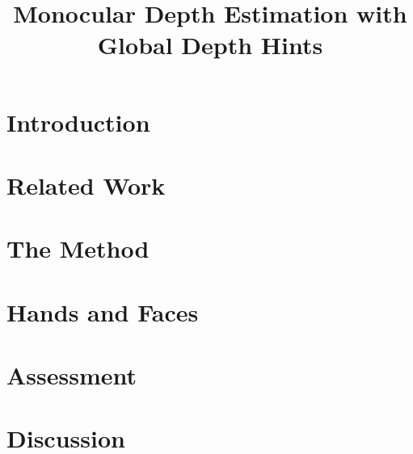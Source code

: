 \documentclass[acmtog,anonymous,timestamp,review]{acmart}
\begin{document}
\title{Monocular Depth Estimation with Global Depth Hints}

\section{Introduction}


\section{Related Work}


\section{The Method}


\section{Hands and Faces}


\section{Assessment}


\section{Discussion}




\end{document}
